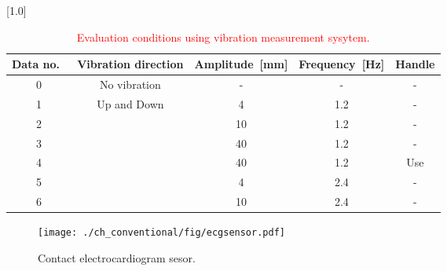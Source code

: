\begin{table}[tb]
  \caption{\textcolor{red}{Evaluation conditions using vibration measurement sysytem.}}
  \centering
  \scalebox{1.0}[1.0]{
  \begin{tabular}{|c|c|c|c|c|} \hline
    Data no.~ & Vibration direction & Amplitude~[mm] & Frequency~[Hz] &  Handle \\ \hline \hline
    0 & No vibration & - & - & - \\ \hline
    1 & \multirow{6}{*}{Up and Down} & 4 & 1.2 & - \\ \cline{1-1} \cline{3-5}
    2 & & 10 & 1.2 & - \\ \cline{1-1} \cline{3-5}
    3 & & 40 & 1.2 & - \\ \cline{1-1} \cline{3-5}
    4 & & 40 & 1.2 & Use \\ \cline{1-1} \cline{3-5}
    5 & & 4 & 2.4 & -\\ \cline{1-1} \cline{3-5}
    6 & & 10 & 2.4 & - \\ \hline
  \end{tabular}
  }
  \label{tab:vibevacondition}
\end{table}

\begin{figure}[tb]
\centering
\texttt{[image: ./ch\_conventional/fig/ecgsensor.pdf]}
\caption{Contact electrocardiogram sesor.}
\label{fig:ecgsensor}
\end{figure}

